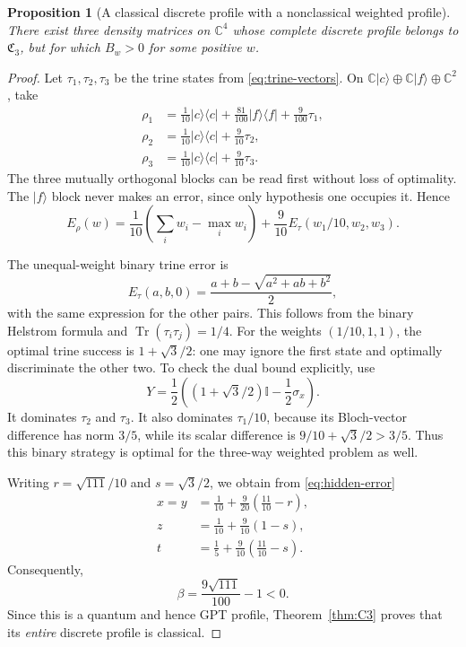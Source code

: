 \documentclass[a4paper,11pt,onecolumn,unpublished]{quantumarticle}
\newtheorem{proposition}[theorem]{Proposition}
\theoremstyle{definition}
\newcommand{\Tr}{\operatorname{Tr}}
\newcommand{\id}{\mathbb I}
\newcommand{\1}{\mathbf 1}
\newcommand{\Creg}{\mathfrak C}
\begin{document}
\begin{proposition}[A classical discrete profile with a nonclassical weighted profile]
\label{prop:hidden}
There exist three density matrices on $\mathbb C^4$ whose complete discrete
profile belongs to $\Creg_3$, but for which $B_w>0$ for some positive $w$.
\end{proposition}
\begin{proof}
Let $\tau_1,\tau_2,\tau_3$ be the trine states from
\eqref{eq:trine-vectors}. On
$\mathbb C|c\rangle\oplus\mathbb C|f\rangle\oplus\mathbb C^2$, take
\begin{align}
 \rho_1&=\frac1{10}|c\rangle\langle c|
       +\frac{81}{100}|f\rangle\langle f|+\frac9{100}\tau_1,
       \label{eq:hidden-states}\\
 \rho_2&=\frac1{10}|c\rangle\langle c|+\frac9{10}\tau_2,\nonumber\\
 \rho_3&=\frac1{10}|c\rangle\langle c|+\frac9{10}\tau_3.\nonumber
\end{align}
The three mutually orthogonal blocks can be read first without loss of
optimality. The $|f\rangle$ block never makes an error, since only hypothesis
one occupies it. Hence
\begin{equation}\label{eq:hidden-error}
 E_\rho(w)=\frac1{10}\left(\sum_iw_i-\max_iw_i\right)
       +\frac9{10}E_\tau(w_1/10,w_2,w_3).
\end{equation}

The unequal-weight binary trine error is
\begin{equation}\label{eq:binary-trine-weighted}
 E_\tau(a,b,0)=\frac{a+b-\sqrt{a^2+ab+b^2}}2,
\end{equation}
with the same expression for the other pairs. This follows from the binary
Helstrom formula and $\Tr(\tau_i\tau_j)=1/4$.
For the weights $(1/10,1,1)$, the optimal trine success is $1+\sqrt3/2$:
one may ignore the first state and optimally discriminate the other two.
To check the dual bound explicitly, use
\[
 Y=\frac12\left((1+\sqrt3/2)\id-\frac12\sigma_x\right).
\]
It dominates $\tau_2$ and $\tau_3$. It also dominates $\tau_1/10$, because its
Bloch-vector difference has norm $3/5$, while its scalar difference is
$9/10+\sqrt3/2>3/5$. Thus this binary strategy is optimal for the three-way
weighted problem as well.

Writing $r=\sqrt{111}/10$ and $s=\sqrt3/2$, we obtain from
\eqref{eq:hidden-error}
\begin{align}
 x=y&=\frac1{10}+\frac9{20}\left(\frac{11}{10}-r\right),\nonumber\\
 z&=\frac1{10}+\frac9{10}(1-s),\label{eq:hidden-profile}\\
 t&=\frac15+\frac9{10}\left(\frac{11}{10}-s\right).\nonumber
\end{align}
Consequently,
\begin{equation}\label{eq:hidden-discrete-beta}
 \beta=\frac{9\sqrt{111}}{100}-1<0.
\end{equation}
Since this is a quantum and hence GPT profile, Theorem~\ref{thm:C3} proves
that its \emph{entire} discrete profile is classical.


\end{proof}
\end{document}
